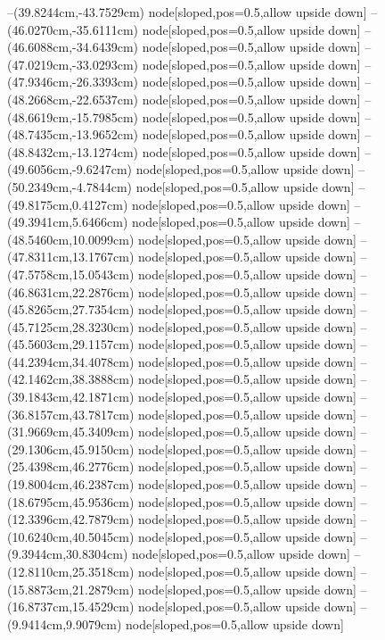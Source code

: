 --(39.8244cm,-43.7529cm) node[sloped,pos=0.5,allow upside down]{\arrowIn}
--(46.0270cm,-35.6111cm) node[sloped,pos=0.5,allow upside down]{\ArrowIn}
--(46.6088cm,-34.6439cm) node[sloped,pos=0.5,allow upside down]{\ArrowIn}
--(47.0219cm,-33.0293cm) node[sloped,pos=0.5,allow upside down]{\ArrowIn}
--(47.9346cm,-26.3393cm) node[sloped,pos=0.5,allow upside down]{\ArrowIn}
--(48.2668cm,-22.6537cm) node[sloped,pos=0.5,allow upside down]{\ArrowIn}
--(48.6619cm,-15.7985cm) node[sloped,pos=0.5,allow upside down]{\ArrowIn}
--(48.7435cm,-13.9652cm) node[sloped,pos=0.5,allow upside down]{\ArrowIn}
--(48.8432cm,-13.1274cm) node[sloped,pos=0.5,allow upside down]{\arrowIn}
--(49.6056cm,-9.6247cm) node[sloped,pos=0.5,allow upside down]{\ArrowIn}
--(50.2349cm,-4.7844cm) node[sloped,pos=0.5,allow upside down]{\ArrowIn}
--(49.8175cm,0.4127cm) node[sloped,pos=0.5,allow upside down]{\ArrowIn}
--(49.3941cm,5.6466cm) node[sloped,pos=0.5,allow upside down]{\ArrowIn}
--(48.5460cm,10.0099cm) node[sloped,pos=0.5,allow upside down]{\ArrowIn}
--(47.8311cm,13.1767cm) node[sloped,pos=0.5,allow upside down]{\ArrowIn}
--(47.5758cm,15.0543cm) node[sloped,pos=0.5,allow upside down]{\ArrowIn}
--(46.8631cm,22.2876cm) node[sloped,pos=0.5,allow upside down]{\ArrowIn}
--(45.8265cm,27.7354cm) node[sloped,pos=0.5,allow upside down]{\ArrowIn}
--(45.7125cm,28.3230cm) node[sloped,pos=0.5,allow upside down]{\arrowIn}
--(45.5603cm,29.1157cm) node[sloped,pos=0.5,allow upside down]{\arrowIn}
--(44.2394cm,34.4078cm) node[sloped,pos=0.5,allow upside down]{\ArrowIn}
--(42.1462cm,38.3888cm) node[sloped,pos=0.5,allow upside down]{\ArrowIn}
--(39.1843cm,42.1871cm) node[sloped,pos=0.5,allow upside down]{\ArrowIn}
--(36.8157cm,43.7817cm) node[sloped,pos=0.5,allow upside down]{\ArrowIn}
--(31.9669cm,45.3409cm) node[sloped,pos=0.5,allow upside down]{\ArrowIn}
--(29.1306cm,45.9150cm) node[sloped,pos=0.5,allow upside down]{\ArrowIn}
--(25.4398cm,46.2776cm) node[sloped,pos=0.5,allow upside down]{\ArrowIn}
--(19.8004cm,46.2387cm) node[sloped,pos=0.5,allow upside down]{\ArrowIn}
--(18.6795cm,45.9536cm) node[sloped,pos=0.5,allow upside down]{\ArrowIn}
--(12.3396cm,42.7879cm) node[sloped,pos=0.5,allow upside down]{\ArrowIn}
--(10.6240cm,40.5045cm) node[sloped,pos=0.5,allow upside down]{\ArrowIn}
--(9.3944cm,30.8304cm) node[sloped,pos=0.5,allow upside down]{\ArrowIn}
--(12.8110cm,25.3518cm) node[sloped,pos=0.5,allow upside down]{\ArrowIn}
--(15.8873cm,21.2879cm) node[sloped,pos=0.5,allow upside down]{\ArrowIn}
--(16.8737cm,15.4529cm) node[sloped,pos=0.5,allow upside down]{\ArrowIn}
--(9.9414cm,9.9079cm) node[sloped,pos=0.5,allow upside down]{\ArrowIn}
